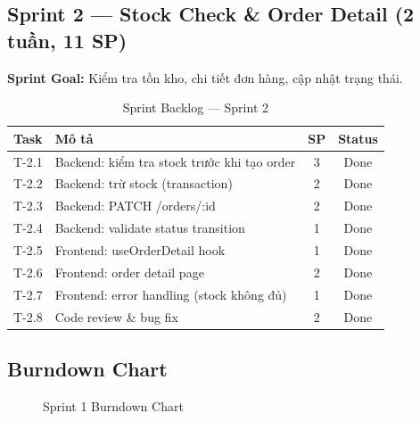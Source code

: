 \documentclass[12pt,a4paper]{article}
\begin{document}
\subsection{Sprint 2 — Stock Check \& Order Detail (2 tuần, 11 SP)}

\textbf{Sprint Goal:} Kiểm tra tồn kho, chi tiết đơn hàng, cập nhật trạng thái.

\begin{table}[H]
\centering
\caption{Sprint Backlog — Sprint 2}
\small
\begin{tabularx}{\textwidth}{cXcc}
\toprule
\textbf{Task} & \textbf{Mô tả} & \textbf{SP} & \textbf{Status} \\
\midrule
T-2.1 & Backend: kiểm tra stock trước khi tạo order & 3 & Done \\
T-2.2 & Backend: trừ stock (transaction) & 2 & Done \\
T-2.3 & Backend: PATCH /orders/:id & 2 & Done \\
T-2.4 & Backend: validate status transition & 1 & Done \\
T-2.5 & Frontend: useOrderDetail hook & 1 & Done \\
T-2.6 & Frontend: order detail page & 2 & Done \\
T-2.7 & Frontend: error handling (stock không đủ) & 1 & Done \\
T-2.8 & Code review \& bug fix & 2 & Done \\
\bottomrule
\end{tabularx}
\end{table}

\subsection{Burndown Chart}

\begin{figure}[H]
\centering
{}
\caption{Sprint 1 Burndown Chart}
\end{figure}
\end{document}
